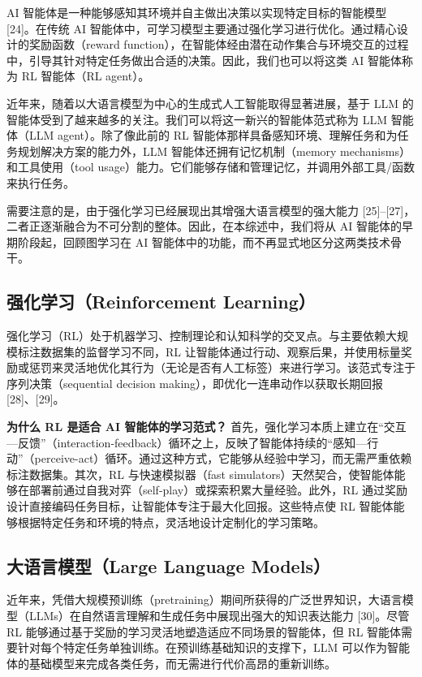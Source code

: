 \documentclass[10pt,UTF8,fontset=fandol]{ctexart}
\begin{document}
AI 智能体是一种能够感知其环境并自主做出决策以实现特定目标的智能模型 [24]。在传统 AI 智能体中，可学习模型主要通过强化学习进行优化。通过精心设计的奖励函数（reward function），在智能体经由潜在动作集合与环境交互的过程中，引导其针对特定任务做出合适的决策。因此，我们也可以将这类 AI 智能体称为 RL 智能体（RL agent）。

近年来，随着以大语言模型为中心的生成式人工智能取得显著进展，基于 LLM 的智能体受到了越来越多的关注。我们可以将这一新兴的智能体范式称为 LLM 智能体（LLM agent）。除了像此前的 RL 智能体那样具备感知环境、理解任务和为任务规划解决方案的能力外，LLM 智能体还拥有记忆机制（memory mechanisms）和工具使用（tool usage）能力。它们能够存储和管理记忆，并调用外部工具/函数来执行任务。

需要注意的是，由于强化学习已经展现出其增强大语言模型的强大能力 [25]--[27]，二者正逐渐融合为不可分割的整体。因此，在本综述中，我们将从 AI 智能体的早期阶段起，回顾图学习在 AI 智能体中的功能，而不再显式地区分这两类技术骨干。

\subsection{强化学习（Reinforcement Learning）}

强化学习（RL）处于机器学习、控制理论和认知科学的交叉点。与主要依赖大规模标注数据集的监督学习不同，RL 让智能体通过行动、观察后果，并使用标量奖励或惩罚来灵活地优化其行为（无论是否有人工标签）来进行学习。该范式专注于序列决策（sequential decision making），即优化一连串动作以获取长期回报 [28]、[29]。

\textbf{为什么 RL 是适合 AI 智能体的学习范式？} 首先，强化学习本质上建立在“交互—反馈”（interaction-feedback）循环之上，反映了智能体持续的“感知—行动”（perceive-act）循环。通过这种方式，它能够从经验中学习，而无需严重依赖标注数据集。其次，RL 与快速模拟器（fast simulators）天然契合，使智能体能够在部署前通过自我对弈（self-play）或探索积累大量经验。此外，RL 通过奖励设计直接编码任务目标，让智能体专注于最大化回报。这些特点使 RL 智能体能够根据特定任务和环境的特点，灵活地设计定制化的学习策略。

\subsection{大语言模型（Large Language Models）}

近年来，凭借大规模预训练（pretraining）期间所获得的广泛世界知识，大语言模型（LLMs）在自然语言理解和生成任务中展现出强大的知识表达能力 [30]。尽管 RL 能够通过基于奖励的学习灵活地塑造适应不同场景的智能体，但 RL 智能体需要针对每个特定任务单独训练。在预训练基础知识的支撑下，LLM 可以作为智能体的基础模型来完成各类任务，而无需进行代价高昂的重新训练。
\end{document}
